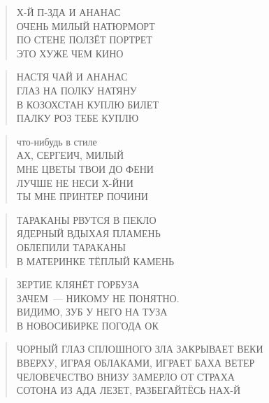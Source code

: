 \poemtitle{***}
\begin{verse}
Х-Й П-ЗДА И АНАНАС\\
ОЧЕНЬ МИЛЫЙ НАТЮРМОРТ\\
ПО СТЕНЕ ПОЛЗЁТ ПОРТРЕТ\\
ЭТО ХУЖЕ ЧЕМ КИНО
\end{verse}

\poemtitle{***}
\begin{verse}
НАСТЯ ЧАЙ И АНАНАС\\
ГЛАЗ НА ПОЛКУ НАТЯНУ\\
В КОЗОХСТАН КУПЛЮ БИЛЕТ\\
ПАЛКУ РОЗ ТЕБЕ КУПЛЮ
\end{verse}

\poemtitle{***}
\begin{verse}
что-нибудь в стиле\\
АХ, СЕРГЕИЧ, МИЛЫЙ\\
МНЕ ЦВЕТЫ ТВОИ ДО ФЕНИ\\
ЛУЧШЕ НЕ НЕСИ Х-ЙНИ\\
ТЫ МНЕ ПРИНТЕР ПОЧИНИ
\end{verse}

\poemtitle{***}
\begin{verse}
ТАРАКАНЫ РВУТСЯ В ПЕКЛО\\
ЯДЕРНЫЙ ВДЫХАЯ ПЛАМЕНЬ\\
ОБЛЕПИЛИ ТАРАКАНЫ\\
В МАТЕРИНКЕ ТЁПЛЫЙ КАМЕНЬ
\end{verse}

\poemtitle{***}
\begin{verse}
ЗЕРТИЕ КЛЯНЁТ ГОРБУЗА\\
ЗАЧЕМ — НИКОМУ НЕ ПОНЯТНО.\\
ВИДИМО, ЗУБ У НЕГО НА ТУЗА\\
В НОВОСИБИРКЕ ПОГОДА ОК
\end{verse}

\poemtitle{***}
\begin{verse}
ЧОРНЫЙ ГЛАЗ СПЛОШНОГО ЗЛА ЗАКРЫВАЕТ ВЕКИ\\
ВВЕРХУ, ИГРАЯ ОБЛАКАМИ, ИГРАЕТ БАХА ВЕТЕР\\
ЧЕЛОВЕЧЕСТВО ВНИЗУ ЗАМЕРЛО ОТ СТРАХА\\
СОТОНА ИЗ АДА ЛЕЗЕТ, РАЗБЕГАЙТЁСЬ НАХ-Й
\end{verse}

